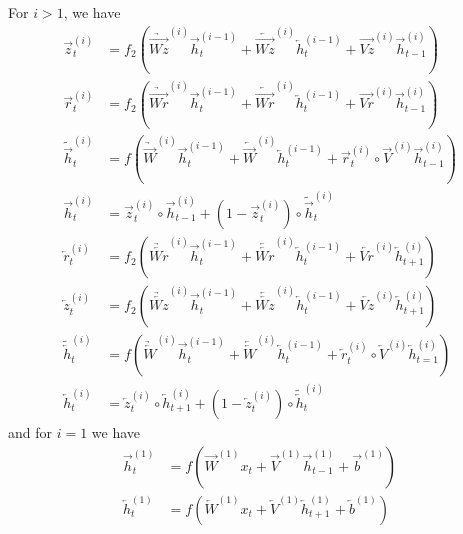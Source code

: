 \documentclass[12pt]{article}
\begin{document}
    For $i > 1$, we have
    \begin{align}
      \overrightarrow{z}_t^{(i)} &= f_2(\underrightarrow{\overrightarrow{Wz}}^{(i)} \overrightarrow{h}_t^{(i-1)} + \underleftarrow{\overrightarrow{Wz}}^{(i)} \overleftarrow{h}_t^{(i-1)} + \overrightarrow{Vz}^{(i)} \overrightarrow{h}_{t-1}^{(i)}) \\
      \overrightarrow{r}_t^{(i)} &= f_2(\underrightarrow{\overrightarrow{Wr}}^{(i)} \overrightarrow{h}_t^{(i-1)} + \underleftarrow{\overrightarrow{Wr}}^{(i)} \overleftarrow{h}_t^{(i-1)} + \overrightarrow{Vr}^{(i)} \overrightarrow{h}_{t-1}^{(i)}) \\
      \widetilde{\overrightarrow{h}}_t^{(i)} &= f(\underrightarrow{\overrightarrow{W}}^{(i)} \overrightarrow{h}_t^{(i-1)} + \underleftarrow{\overrightarrow{W}}^{(i)} \overleftarrow{h}_t^{(i-1)} + \overrightarrow{r}_t^{(i)} \circ \overrightarrow{V}^{(i)} \overrightarrow{h}_{t-1}^{(i)}) \\
      \overrightarrow{h}_t^{(i)} &= \overrightarrow{z}_t^{(i)} \circ \overrightarrow{h}_{t-1}^{(i)} + (1 - \overrightarrow{z}_t^{(i)}) \circ \widetilde{\overrightarrow{h}}_t^{(i)} \\
      \overleftarrow{r}_t^{(i)} &= f_2(\underrightarrow{\overleftarrow{Wr}}^{(i)} \overrightarrow{h}_t^{(i-1)} + \underleftarrow{\overleftarrow{Wr}}^{(i)} \overleftarrow{h}_t^{(i-1)} + \overleftarrow{Vr}^{(i)} \overleftarrow{h}_{t+1}^{(i)}) \\
      \overleftarrow{z}_t^{(i)} &= f_2(\underrightarrow{\overleftarrow{Wz}}^{(i)} \overrightarrow{h}_t^{(i-1)} + \underleftarrow{\overleftarrow{Wz}}^{(i)} \overleftarrow{h}_t^{(i-1)} + \overleftarrow{Vz}^{(i)} \overleftarrow{h}_{t+1}^{(i)}) \\
      \widetilde{\overleftarrow{h}}_t^{(i)} &= f(\underrightarrow{\overleftarrow{W}}^{(i)} \overrightarrow{h}_t^{(i-1)} + \underleftarrow{\overleftarrow{W}}^{(i)} \overleftarrow{h}_t^{(i-1)} + \overleftarrow{r}_t^{(i)} \circ \overleftarrow{V}^{(i)} \overleftarrow{h}_{t=1}^{(i)}) \\
      \overleftarrow{h}_t^{(i)} &= \overleftarrow{z}_t^{(i)} \circ \overleftarrow{h}_{t+1}^{(i)} + (1 - \overleftarrow{z}_t^{(i)}) \circ \widetilde{\overleftarrow{h}}_t^{(i)}
    \end{align}
    and for $i = 1$ we have
    \begin{align}
      \overrightarrow{h}_t^{(1)} &= f(\overrightarrow{W}^{(1)} x_t + \overrightarrow{V}^{(1)} \overrightarrow{h}_{t-1}^{(1)} + \overrightarrow{b}^{(1)}) \\
      \overleftarrow{h}_t^{(1)} &= f(\overleftarrow{W}^{(1)} x_t + \overleftarrow{V}^{(1)} \overleftarrow{h}_{t+1}^{(1)} + \overleftarrow{b}^{(1)})
    \end{align}
\end{document}

